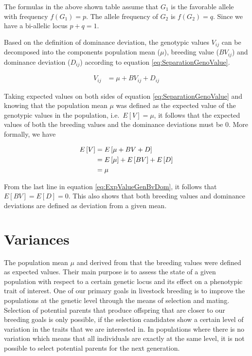 \documentclass[
]{book}
\theoremstyle{definition}
\theoremstyle{definition}
\theoremstyle{definition}
\theoremstyle{remark}
\begin{document}
\vspace{5ex}

The formulas in the above shown table assume that \(G_1\) is the favorable allele with frequency \(f(G_1) = p\). The allele frequency of \(G_2\) is \(f(G_2) = q\). Since we have a bi-allelic locus \(p+q=1\).

Based on the definition of dominance deviation, the genotypic values \(V_{ij}\) can be decomposed into the components population mean (\(\mu\)), breeding value (\(BV_{ij}\)) and dominance deviation (\(D_{ij}\)) according to equation \eqref{eq:SeparationGenoValue}.

\begin{align}
V_{ij} &=   \mu + BV_{ij} + D_{ij}
\label{eq:SeparationGenoValue}
\end{align}

Taking expected values on both sides of equation \eqref{eq:SeparationGenoValue} and knowing that the population mean \(\mu\) was defined as the expected value of the genotypic values in the population, i.e.~\(E\left[ V \right] = \mu\), it follows that the expected values of both the breeding values and the dominance deviations must be \(0\). More formally, we have

\begin{align}
E\left[ V \right] &=  E\left[ \mu + BV + D \right] \notag \\
                  &=  E\left[ \mu \right]  + E\left[ BV \right] + E\left[ D \right] \notag \\
                  &=  \mu
\label{eq:ExpValueGenBvDom}
\end{align}

From the last line in equation \eqref{eq:ExpValueGenBvDom}, it follows that \(E\left[ BV \right] = E\left[ D \right] = 0\). This also shows that both breeding values and dominance deviations are defined as deviation from a given mean.

\hypertarget{variances}{%
\section{Variances}\label{variances}}

The population mean \(\mu\) and derived from that the breeding values were defined as expected values. Their main purpose is to assess the state of a given population with respect to a certain genetic locus and its effect on a phenotypic trait of interest. One of our primary goals in livestock breeding is to improve the populations at the genetic level through the means of selection and mating. Selection of potential parents that produce offspring that are closer to our breeding goals is only possible, if the selection candidates show a certain level of variation in the traits that we are interested in. In populations where there is no variation which means that all individuals are exactly at the same level, it is not possible to select potential parents for the next generation.
\end{document}
